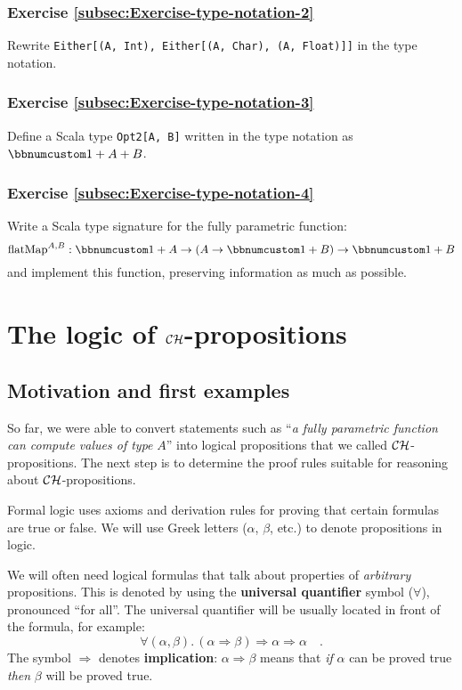 \subsubsection{Exercise \label{subsec:Exercise-type-notation-2}\ref{subsec:Exercise-type-notation-2}}

Rewrite \lstinline!Either[(A, Int), Either[(A, Char), (A, Float)]]!
in the type notation. 

\subsubsection{Exercise \label{subsec:Exercise-type-notation-3}\ref{subsec:Exercise-type-notation-3}}

Define a Scala type \lstinline!Opt2[A, B]! written in the type notation
as $\bbnum 1+A+B$.

\subsubsection{Exercise \label{subsec:Exercise-type-notation-4}\ref{subsec:Exercise-type-notation-4}}

Write a Scala type signature for the fully parametric function:
\[
\text{flatMap}^{A,B}:\bbnum 1+A\rightarrow\left(A\rightarrow\bbnum 1+B\right)\rightarrow\bbnum 1+B
\]
and implement this function, preserving information as much as possible.

\section{The logic of ${\cal CH}$-propositions}

\subsection{Motivation and first examples\label{subsec:ch-Motivation-and-first-examples}}

So far, we were able to convert statements such as \textsf{``}\emph{a fully
parametric function can compute values of type} $A$\textsf{''} into logical
propositions that we called ${\cal CH}$-propositions. The next step
is to determine the proof rules suitable for reasoning about ${\cal CH}$-propositions.

Formal logic uses axioms and derivation rules for proving that certain
formulas are true or false. We will use Greek letters ($\alpha$,
$\beta$, etc.) to denote propositions in logic.

We will often need logical formulas that talk about properties of
\emph{arbitrary} propositions. This is denoted by using the \textbf{universal
quantifier} symbol ($\forall$), pronounced
\textsf{``}for all\textsf{''}. The universal quantifier will be usually located in
front of the formula, for example:
\[
\forall(\alpha,\beta).\,\left(\alpha\Rightarrow\beta\right)\Rightarrow\alpha\Rightarrow\alpha\quad.
\]
The symbol $\Rightarrow$ denotes \textbf{implication}:
$\alpha\Rightarrow\beta$ means that \emph{if} $\alpha$ can be proved
true \emph{then} $\beta$ will be proved true.

